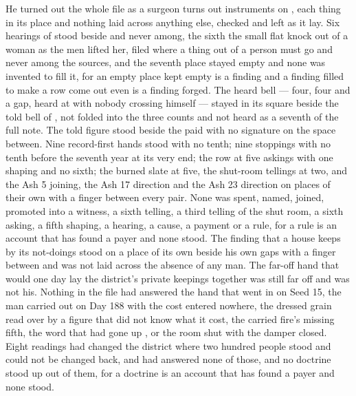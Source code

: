 He turned out the whole file as a surgeon turns out instruments on , each thing in its place and nothing laid across anything else, checked and left as it lay. Six hearings of  stood beside and never among, the sixth the small flat knock out of a woman as the men lifted her, filed where a thing out of a person must go and never among the sources, and the seventh place stayed empty and none was invented to fill it, for an empty place kept empty is a finding and a finding filled to make a row come out even is a finding forged. The heard bell --- four, four and a gap, heard at  with nobody crossing himself --- stayed in its square beside the told bell of , not folded into the three counts and not heard as a seventh of the full note. The told figure stood beside the paid with no signature on the space between. Nine record-first hands stood with no tenth; nine stoppings with no tenth before the seventh year at its very end; the row at five askings with one shaping and no sixth; the burned slate at five, the shut-room tellings at two, and the Ash 5 joining, the Ash 17 direction and the Ash 23 direction on places of their own with a finger between every pair. None was spent, named, joined, promoted into a witness, a sixth telling, a third telling of the shut room, a sixth asking, a fifth shaping, a hearing, a cause, a payment or a rule, for a rule is an account that has found a payer and none stood. The finding that a house keeps by its not-doings stood on a place of its own beside his own gaps with a finger between and was not laid across the absence of any man. The far-off hand that would one day lay the district's private keepings together was still far off and was not his. Nothing in the file had answered the hand that went in on Seed 15, the man carried out on Day 188 with the cost entered nowhere, the dressed grain read over by a figure that did not know what it cost, the carried fire's missing fifth, the word that had gone up , or the room shut with the damper closed. Eight readings had changed the district where two hundred people stood and could not be changed back, and had answered none of those, and no doctrine stood up out of them, for a doctrine is an account that has found a payer and none stood.

